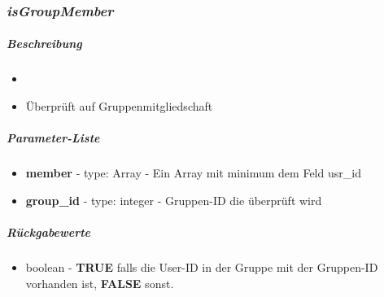 \subsubsection*{\textit{isGroupMember}}\label{isGroupMemberEMT}
\subparagraph{Beschreibung}
\begin{itemize}
	\item[] \noindent{}
	\item[] Überprüft auf Gruppenmitgliedschaft 
\end{itemize}
\subparagraph{Parameter-Liste}
\begin{itemize}
	\item[] \textbf{member} - type: Array - Ein Array mit minimum dem Feld usr\_id
	\item[] \textbf{group\_id} - type: integer - Gruppen-ID die überprüft wird
\end{itemize}
\subparagraph{Rückgabewerte}
\begin{itemize}
	\item[] boolean - \textbf{TRUE} falls die User-ID in der Gruppe mit der Gruppen-ID vorhanden ist, \textbf{FALSE} sonst.
\end{itemize}
